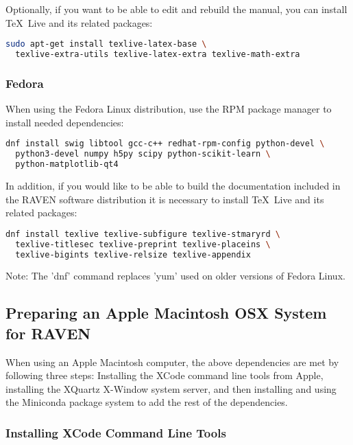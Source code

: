Optionally, if you want to be able to edit and rebuild the manual, you can
install \TeX~Live and its related packages:
\begin{lstlisting}[language=bash]
  sudo apt-get install texlive-latex-base \
  texlive-extra-utils texlive-latex-extra texlive-math-extra
\end{lstlisting}

\goToRavenInstallation

\subsubsection{Fedora}

When using the Fedora Linux distribution, use the RPM package manager to
install needed dependencies:

\begin{lstlisting}[language=bash]
dnf install swig libtool gcc-c++ redhat-rpm-config python-devel \
  python3-devel numpy h5py scipy python-scikit-learn \
  python-matplotlib-qt4
\end{lstlisting}

In addition, if you would like to be able to build the documentation
included in the RAVEN software distribution it is necessary to install
\TeX~Live and its related packages:
\begin{lstlisting}[language=bash]
dnf install texlive texlive-subfigure texlive-stmaryrd \
  texlive-titlesec texlive-preprint texlive-placeins \
  texlive-bigints texlive-relsize texlive-appendix
\end{lstlisting}

Note: The 'dnf' command replaces 'yum' used on older versions of
Fedora Linux.

\goToRavenInstallation

\subsection{Preparing an Apple Macintosh OSX System for RAVEN}
\label{sysprep_osx}

When using an Apple Macintosh computer, the above dependencies are met
by following three steps: Installing the XCode command line tools from Apple,
installing the XQuartz  X-Window system server, and then installing and using the Miniconda
package system to add the rest of the dependencies.

\subsubsection{Installing XCode Command Line Tools}


